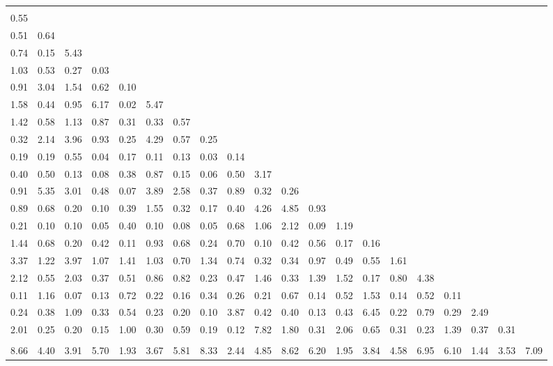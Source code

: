 \documentclass[a4paper,12pt]{article}
\begin{document}
\begin{center}
{\tiny
\begin{tabular}{p{0.33cm}p{0.33cm}p{0.33cm}p{0.33cm}p{0.33cm}p{0.33cm}p{0.33cm}p{0.33cm}p{0.33cm}p{0.33cm}p{0.33cm}p{0.33cm}p{0.33cm}p{0.33cm}p{0.33cm}p{0.33cm}p{0.33cm}p{0.33cm}p{0.33cm}p{0.33cm}}
  &&&&&&&&&&&&&&&&&&& \\
0.55 &  &&&&&&&&&&&&&&&&&& \\
0.51 & 0.64 &  &&&&&&&&&&&&&&&& \\
0.74 & 0.15 & 5.43 &  &&&&&&&&&&&&&&&& \\
1.03 & 0.53 & 0.27 & 0.03 &  &&&&&&&&&&&&&&& \\
0.91 & 3.04 & 1.54 & 0.62 & 0.10 &   &&&&&&&&&&&&&& \\
1.58 & 0.44 & 0.95 & 6.17 & 0.02 & 5.47 &  &&&&&&&&&&&&& \\
1.42 & 0.58 & 1.13 & 0.87 & 0.31 & 0.33 & 0.57 &  &&&&&&&&&&&& \\
0.32 & 2.14 & 3.96 & 0.93 & 0.25 & 4.29 & 0.57 & 0.25 &  &&&&&&&&&&& \\
0.19 & 0.19 & 0.55 & 0.04 & 0.17 & 0.11 & 0.13 & 0.03 & 0.14 &  &&&&&&&&&& \\
0.40 & 0.50 & 0.13 & 0.08 & 0.38 & 0.87 & 0.15 & 0.06 & 0.50 & 3.17 &  &&&&&&&&& \\
0.91 & 5.35 & 3.01 & 0.48 & 0.07 & 3.89 & 2.58 & 0.37 & 0.89 & 0.32 & 0.26 &  &&&&&&&& \\
0.89 & 0.68 & 0.20 & 0.10 & 0.39 & 1.55 & 0.32 & 0.17 & 0.40 & 4.26 & 4.85 & 0.93 &  &&&&&&& \\
0.21 & 0.10 & 0.10 & 0.05 & 0.40 & 0.10 & 0.08 & 0.05 & 0.68 & 1.06 & 2.12 & 0.09 & 1.19 &  &&&&&& \\
1.44 & 0.68 & 0.20 & 0.42 & 0.11 & 0.93 & 0.68 & 0.24 & 0.70 & 0.10 & 0.42 & 0.56 & 0.17 & 0.16 &  &&&&& \\
3.37 & 1.22 & 3.97 & 1.07 & 1.41 & 1.03 & 0.70 & 1.34 & 0.74 & 0.32 & 0.34 & 0.97 & 0.49 & 0.55 & 1.61 &  &&&& \\
2.12 & 0.55 & 2.03 & 0.37 & 0.51 & 0.86 & 0.82 & 0.23 & 0.47 & 1.46 & 0.33 & 1.39 & 1.52 & 0.17 & 0.80 & 4.38 &  &&& \\
0.11 & 1.16 & 0.07 & 0.13 & 0.72 & 0.22 & 0.16 & 0.34 & 0.26 & 0.21 & 0.67 & 0.14 & 0.52 & 1.53 & 0.14 & 0.52 & 0.11 &  && \\
0.24 & 0.38 & 1.09 & 0.33 & 0.54 & 0.23 & 0.20 & 0.10 & 3.87 & 0.42 & 0.40 & 0.13 & 0.43 & 6.45 & 0.22 & 0.79 & 0.29 & 2.49 &   & \\
2.01 & 0.25 & 0.20 & 0.15 & 1.00 & 0.30 & 0.59 & 0.19 & 0.12 & 7.82 & 1.80 & 0.31 & 2.06 & 0.65 & 0.31 & 0.23 & 1.39 & 0.37 & 0.31 &   \\
\\
8.66 & 4.40 & 3.91 & 5.70 & 1.93 & 3.67 & 5.81 & 8.33 & 2.44 & 4.85 & 8.62 & 6.20 & 1.95 & 3.84 & 4.58 & 6.95 & 6.10 & 1.44 & 3.53 & 7.09  \\
\end{tabular}
}
\end{center}
\end{document}
